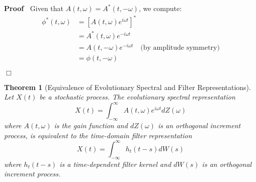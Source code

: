 \documentclass{article}
\newenvironment{proof}{\noindent\textbf{Proof\ }}{\hspace*{\fill}$\Box$\medskip}
\newtheorem{theorem}{Theorem}
\begin{document}
\begin{proof}
  Given that $A (t, \omega) = A^{\ast} (t, - \omega)$, we compute:
  \begin{equation}
    \begin{array}{ll}
      \phi^{\ast} (t, \omega) & = [A (t, \omega) e^{i \omega t}]^{\ast}\\
      & = A^{\ast} (t, \omega) e^{- i \omega t}\\
      & = A (t, - \omega) e^{- i \omega t} \quad \text{(by amplitude
      symmetry)}\\
      & = \phi (t, - \omega)
    \end{array}
  \end{equation}
  
\end{proof}

\begin{theorem}[Equivalence of Evolutionary Spectral and Filter
Representations]
  Let $X (t)$ be a stochastic process. The evolutionary spectral
  representation
  \begin{equation}
    X (t) = \int_{- \infty}^{\infty} A (t, \omega) e^{i \omega t} dZ (\omega)
  \end{equation}
  where $A (t, \omega)$ is the gain function and $dZ (\omega)$ is an
  orthogonal increment process, is equivalent to the time-domain filter
  representation
  \begin{equation}
    X (t) = \int_{- \infty}^{\infty} h_t  (t - s) dW (s)
  \end{equation}
  where $h_t  (t - s)$ is a time-dependent filter kernel and $dW (s)$ is an
  orthogonal increment process.
\end{theorem}
\end{document}
